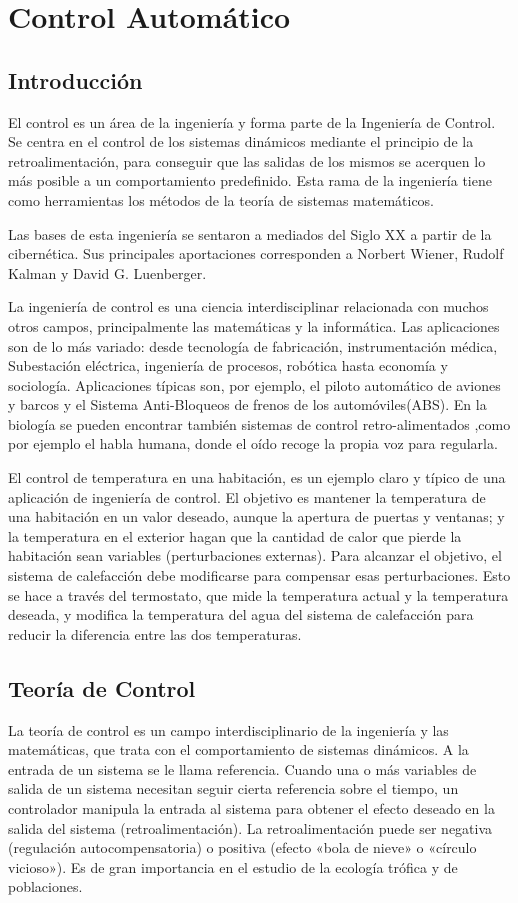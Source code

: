 \chapter{Control Automático}
\section{Introducción}

El control es un área de la ingeniería y forma parte de la Ingeniería de
Control. Se centra en el control de los sistemas dinámicos mediante el principio
de la retroalimentación, para conseguir que las salidas de los mismos se
acerquen lo más posible a un comportamiento predefinido. Esta rama de la
ingeniería tiene como herramientas los métodos de la teoría de sistemas
matemáticos.

Las bases de esta ingeniería se sentaron a mediados del Siglo XX a partir de la
cibernética. Sus principales aportaciones corresponden a Norbert Wiener, Rudolf
Kalman y David G. Luenberger.

La ingeniería de control es una ciencia interdisciplinar relacionada con muchos
otros campos, principalmente las matemáticas y la informática. Las aplicaciones
son de lo más variado: desde tecnología de fabricación, instrumentación médica,
Subestación eléctrica, ingeniería de procesos, robótica hasta economía y
sociología. Aplicaciones típicas son, por ejemplo, el piloto automático de
aviones y barcos y el Sistema Anti-Bloqueos de frenos de los automóviles(ABS).
En la biología se pueden encontrar también sistemas de control retro-alimentados
,como por ejemplo el habla humana, donde el oído recoge la propia voz para
regularla.

El control de temperatura en una habitación, es un ejemplo claro y típico de una
aplicación de ingeniería de control. El objetivo es mantener la temperatura de
una habitación en un valor deseado, aunque la apertura de puertas y ventanas; y
la temperatura en el exterior hagan que la cantidad de calor que pierde la
habitación sean variables (perturbaciones externas). Para alcanzar el objetivo,
el sistema de calefacción debe modificarse para compensar esas perturbaciones.
Esto se hace a través del termostato, que mide la temperatura actual y la
temperatura deseada, y modifica la temperatura del agua del sistema de
calefacción para reducir la diferencia entre las dos temperaturas.

\section{Teoría de Control}
La teoría de control es un campo interdisciplinario de la ingeniería y las
matemáticas, que trata con el comportamiento de sistemas dinámicos. A la entrada
de un sistema se le llama referencia. Cuando una o más variables de salida de un
sistema necesitan seguir cierta referencia sobre el tiempo, un controlador
manipula la entrada al sistema para obtener el efecto deseado en la salida del
sistema (retroalimentación). La retroalimentación puede ser negativa (regulación
autocompensatoria) o positiva (efecto «bola de nieve» o «círculo vicioso»). Es
de gran importancia en el estudio de la ecología trófica y de poblaciones.

